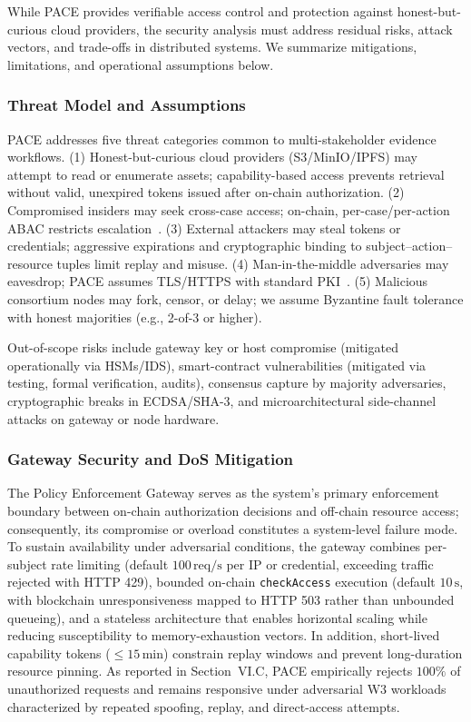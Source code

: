 \documentclass[pdflatex,sn-mathphys-num]{sn-jnl}
\begin{document}
While PACE provides verifiable access control and protection against honest-but-curious cloud providers, the security analysis must address residual risks, attack vectors, and trade-offs in distributed systems. We summarize mitigations, limitations, and operational assumptions below.

\subsubsection{Threat Model and Assumptions}

PACE addresses five threat categories common to multi-stakeholder evidence workflows. (1) Honest-but-curious cloud providers (S3/MinIO/IPFS) may attempt to read or enumerate assets; capability-based access prevents retrieval without valid, unexpired tokens issued after on-chain authorization. (2) Compromised insiders may seek cross-case access; on-chain, per-case/per-action ABAC restricts escalation~\cite{xiong2023bdim}. (3) External attackers may steal tokens or credentials; aggressive expirations and cryptographic binding to subject--action--resource tuples limit replay and misuse. (4) Man-in-the-middle adversaries may eavesdrop; PACE assumes TLS/HTTPS with standard PKI~\cite{dorri2017coordination}. (5) Malicious consortium nodes may fork, censor, or delay; we assume Byzantine fault tolerance with honest majorities (e.g., 2-of-3 or higher).

Out-of-scope risks include gateway key or host compromise (mitigated operationally via HSMs/IDS), smart-contract vulnerabilities (mitigated via testing, formal verification, audits), consensus capture by majority adversaries, cryptographic breaks in ECDSA/SHA-3, and microarchitectural side-channel attacks on gateway or node hardware.

\subsubsection{Gateway Security and DoS Mitigation}
The Policy Enforcement Gateway serves as the system's primary enforcement boundary between on-chain authorization decisions and off-chain resource access; consequently, its compromise or overload constitutes a system-level failure mode. To sustain availability under adversarial conditions, the gateway combines per-subject rate limiting (default \(100\,\mathrm{req/s}\) per IP or credential, exceeding traffic rejected with HTTP 429), bounded on-chain \texttt{checkAccess} execution (default \(10\,\mathrm{s}\), with blockchain unresponsiveness mapped to HTTP 503 rather than unbounded queueing), and a stateless architecture that enables horizontal scaling while reducing susceptibility to memory-exhaustion vectors. In addition, short-lived capability tokens (\(\leq 15\,\mathrm{min}\)) constrain replay windows and prevent long-duration resource pinning. As reported in Section~VI.C, PACE empirically rejects \(100\%\) of unauthorized requests and remains responsive under adversarial W3 workloads characterized by repeated spoofing, replay, and direct-access attempts.
\end{document}

